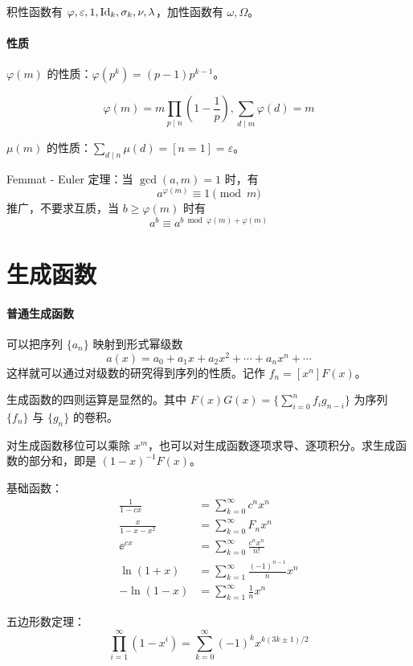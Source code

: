 \documentclass{proart}
\begin{document}
积性函数有 $\varphi,\varepsilon,1,\operatorname{Id}_k,\sigma_k,\nu,\lambda$，加性函数有 $\omega,\Omega$。

\paragraph{性质}
$\varphi(m)$ 的性质：$\varphi(p^k) = (p-1)p^{k-1}$。

\[ \varphi(m) = m \prod_{p \mid n}\left( 1-\frac{1}{p} \right), \sum_{d \mid m} \varphi(d) = m \]

$\mu(m)$ 的性质：$\sum\limits_{d \mid n} \mu(d) = [n=1] = \varepsilon$。

Femmat - Euler 定理：当 $\gcd(a,m) = 1$ 时，有
\[ a^{\varphi(m)} \equiv 1 \pmod m \]
推广，不要求互质，当 $b \geqslant \varphi(m)$ 时有
\[ a^b \equiv a^{b \bmod \varphi(m) + \varphi(m) } \]


\section{生成函数}

\paragraph{普通生成函数}
可以把序列 $\{a_n\}$ 映射到形式幂级数
\[ a(x) = a_0 + a_1 x + a_2 x^2 + \cdots + a_nx^n + \cdots \]
这样就可以通过对级数的研究得到序列的性质。记作 $f_n = [x^n]F(x)$。

生成函数的四则运算是显然的。其中 $F(x)G(x) = \{\sum\limits_{i=0}^n f_ig_{n-i}\}$ 为序列 $\{f_n\}$ 与 $\{g_n\}$ 的卷积。

对生成函数移位可以乘除 $x^m$，也可以对生成函数逐项求导、逐项积分。求生成函数的部分和，即是 $(1-x)^{-1}F(x)$。

基础函数：
\begin{equation*}
    \begin{aligned}
        \frac{1}{1-cx} &= \sum_{k=0}^\infty c^nx^n\\
        \frac{x}{1-x-x^2} &= \sum_{k=0}^\infty F_nx^n \\
        \ee^{cx} &= \sum_{k=0}^\infty \frac{c^nx^n}{n!} \\
        \ln(1+x) &= \sum_{k=1}^\infty \frac{(-1)^{n-1}}{n} x^n\\
        -\ln(1-x) &= \sum_{k=1}^\infty \frac{1}{n} x^n
    \end{aligned}
\end{equation*}

五边形数定理：
\[ \prod_{i=1}^\infty (1-x^i) = \sum_{k=0}^{\infty} (-1)^k x^{k(3k \pm 1) /2} \]
\end{document}
